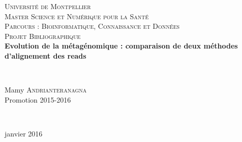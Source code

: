 \begin{titlepage}
  \begin{sffamily}
  \begin{center}


    \textsc{\LARGE Université de Montpellier}\\[2cm]

    \textsc{\Large Master Science et Numérique pour la Santé}\\[0.5cm]
		
		\textsc{\Large Parcours : Bioinformatique, Connaissance et Données}\\[3cm]
		
		\textsc{\Large Projet Bibliographique }\\[1.5cm]


    { \huge \bfseries Evolution de la métagénomique : comparaison de deux méthodes d'alignement des reads \\[0.1cm] }

    \HRule \\[3cm]


    \begin{minipage}{0.8\textwidth}
      \begin{centering} \large
        Mamy \textsc{Andrianteranagna}\\
        Promotion 2015-2016\\
      \end{centering}
    \end{minipage}\\[3cm]

    \vfill

    
    {\large janvier 2016}

  \end{center}
  \end{sffamily}
\end{titlepage}

